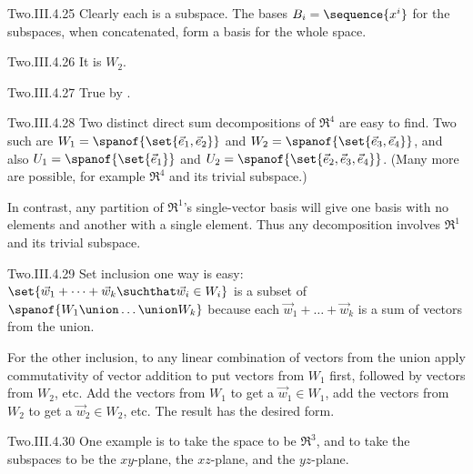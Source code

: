\begin{ans}{Two.III.4.25}
      Clearly each is a subspace.
      The bases \( B_i=\sequence{x^i} \) for the subspaces, when concatenated,
      form a basis for the whole space.
    
\end{ans}
\begin{ans}{Two.III.4.26}
       It is \( W_2 \).
    
\end{ans}
\begin{ans}{Two.III.4.27}
      True by .
    
\end{ans}
\begin{ans}{Two.III.4.28}
      Two distinct direct sum decompositions of \( \Re^4 \) are easy
      to find.
      Two such are
      \( W_1=\spanof{\set{\vec{e}_1,\vec{e}_2}} \) and
      \( W_2=\spanof{\set{\vec{e}_3,\vec{e}_4}} \), and also
      \( U_1=\spanof{\set{\vec{e}_1}} \) and
      \( U_2=\spanof{\set{\vec{e}_2,\vec{e}_3,\vec{e}_4}} \).
      (Many more are possible,
      for example \( \Re^4 \) and its trivial subspace.)

      In contrast, any partition of \( \Re^1 \)'s single-vector basis will
      give one basis with no elements and another with a single element.
      Thus any decomposition involves \( \Re^1 \) and its trivial
      subspace.
    
\end{ans}
\begin{ans}{Two.III.4.29}
       Set inclusion one way is easy:
       \( \set{\vec{w}_1+\dots+\vec{w}_k\suchthat \vec{w}_i\in W_i} \)
       is a subset of \( \spanof{W_1\union \dots \union W_k}  \)
       because each \( \vec{w}_1+\dots+\vec{w}_k \) is a sum of vectors from
       the union.

       For the other inclusion, to any linear combination of vectors from
       the union apply commutativity of vector addition to
       put vectors from \( W_1 \) first, followed by vectors from \( W_2 \),
       etc.
       Add the vectors from \( W_1 \) to get a \( \vec{w}_1\in W_1 \),
       add the vectors from \( W_2 \) to get a \( \vec{w}_2\in W_2 \), etc.
       The result has the desired form.
     
\end{ans}
\begin{ans}{Two.III.4.30}
      One example is to take the space to be $\Re^3$, and to take the
      subspaces to be the $xy$-plane, the $xz$-plane, and the $yz$-plane.
    
\end{ans}

